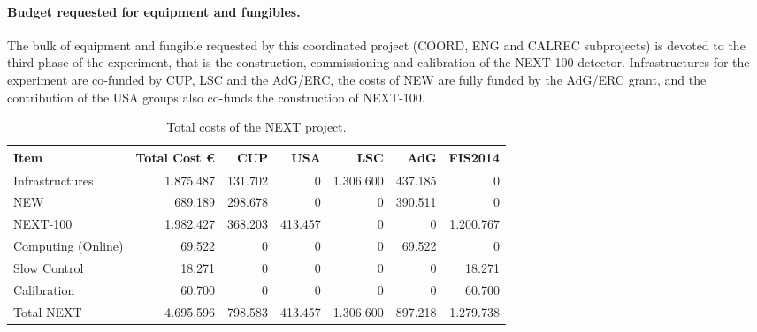\paragraph{Budget requested for equipment and fungibles.}

The bulk of equipment and fungible requested by this coordinated project (COORD, ENG and CALREC subprojects) is devoted to the third phase of the experiment, that is the construction, commissioning and calibration of the NEXT-100 detector. 
 Infrastructures for the experiment are co-funded by CUP, LSC and the AdG/ERC, the costs of NEW are fully funded by the AdG/ERC grant, and the contribution of the USA groups also co-funds the construction of NEXT-100. 

\begin{table}[h!]
\begin{center}
\begin{tabular}{|l|r|r|r|r|r|r|}
\hline
 Item              & Total Cost \euro & CUP	&USA &	LSC & AdG &	FIS2014 \\
 \hline
Infrastructures    & 1.875.487 & 131.702 & 	 0 & 1.306.600 & 437.185 &	   0 \\
NEW                &   689.189 & 298.678 & 	 0 &	     0 & 390.511 &	   0 \\	
NEXT-100           & 1.982.427 & 368.203 & 413.457 &	     0 &       0 & 1.200.767 \\
Computing (Online) &    69.522 &       0 & 	 0 &	     0 &  69.522 &	   0 \\
Slow Control       &    18.271 &       0 &	 0 &	     0 &       0 &    18.271 \\
Calibration        &	60.700 &       0 &	 0 &	     0 &       0 &    60.700 \\
 \hline
Total  NEXT        & 4.695.596 & 798.583 & 413.457 & 1.306.600 & 897.218 & 1.279.738 \\
 \hline\hline
\end{tabular}  
\caption{Total costs of the NEXT project.}
\label{tab.TCOSTS}
\end{center}
\end{table} 

